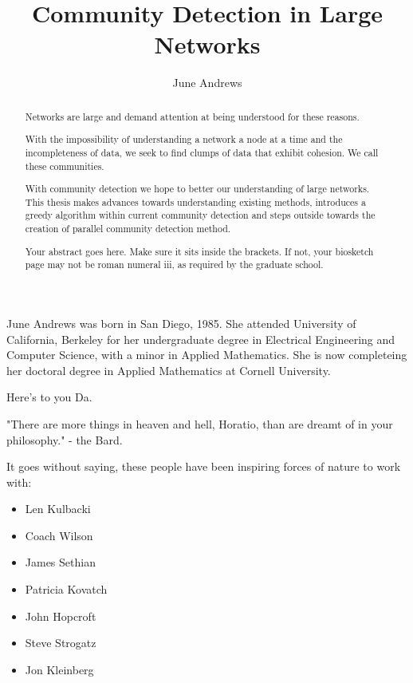\documentclass[phd,tocprelim]{cornell}
\title {Community Detection in Large Networks}
\author {June Andrews}
\begin{document}
\maketitle
\makecopyright

\begin{abstract}
Networks are large and demand attention at being understood for these reasons.

With the impossibility of understanding a network a node at a time and the incompleteness of data, we seek to find clumps of data that exhibit cohesion.  We call these communities.

With community detection we hope to better our understanding of large networks.  This thesis makes advances towards understanding existing methods, introduces a greedy algorithm within current community detection and steps outside towards the creation of parallel community detection method.

Your abstract goes here. Make sure it sits inside the brackets. If not,
your biosketch page may not be roman numeral iii, as required by the
graduate school.
\end{abstract}

\begin{biosketch}
June Andrews was born in San Diego, 1985.
She attended University of California, Berkeley for her undergraduate degree in Electrical Engineering and Computer Science, with a minor in Applied Mathematics.
She is now completeing her doctoral degree in Applied Mathematics at Cornell University.
\end{biosketch}

\begin{dedication}
Here's to you Da.

"There are more things in heaven and hell, Horatio, than are dreamt of in your philosophy." - the Bard.
\end{dedication}

\begin{acknowledgements}
It goes without saying, these people have been inspiring forces of nature to work with:
\begin{itemize}
\item Len Kulbacki
\item Coach Wilson
\item James Sethian
\item Patricia Kovatch
\item John Hopcroft
\item Steve Strogatz
\item Jon Kleinberg
\end{itemize}
\end{acknowledgements}
\end{document}
